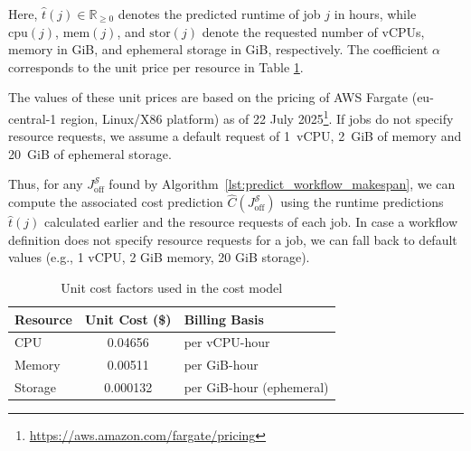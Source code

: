 Here, \(\hat{t}(j) \in \mathbb{R}_{\geq 0}\) denotes the predicted runtime of job \(j\) in hours, while \(\mathrm{cpu}(j)\), \(\mathrm{mem}(j)\), and \(\mathrm{stor}(j)\) denote the requested number of vCPUs, memory in GiB, and ephemeral storage in GiB, respectively. The coefficient \(\alpha\) corresponds to the unit price per resource in Table \ref{tab:unit-cost-factors}.

The values of these unit prices are based on the pricing of AWS Fargate (eu-central-1 region, Linux/X86 platform) as of 22 July 2025\footnote{\url{https://aws.amazon.com/fargate/pricing}}.
If jobs do not specify resource requests, we assume a default request of 1~vCPU, 2~GiB of memory and 20~GiB of ephemeral storage.

Thus, for any $J^{\mathcal{S}}_\text{off}$ found by Algorithm~\ref{lst:predict_workflow_makespan}, we can compute the associated cost prediction $\hat{C}(J^{\mathcal{S}}_\text{off})$ using the runtime predictions $\hat{t}(j)$ calculated earlier and the resource requests of each job.
In case a workflow definition does not specify resource requests for a job, we can fall back to default values (e.g., 1 vCPU, 2 GiB memory, 20 GiB storage).

\begin{table}[t]
\caption{Unit cost factors used in the cost model}
\centering
\footnotesize
\setlength{\tabcolsep}{4pt}
\begin{tabular}{l|c|l}
\textbf{Resource} & \textbf{Unit Cost (\$)} & \textbf{Billing Basis} \\
\hline
CPU     & 0.04656  & per vCPU-hour \\
Memory  & 0.00511  & per GiB-hour \\
Storage & 0.000132 & per GiB-hour (ephemeral)
\end{tabular}
\label{tab:unit-cost-factors}
\end{table}


